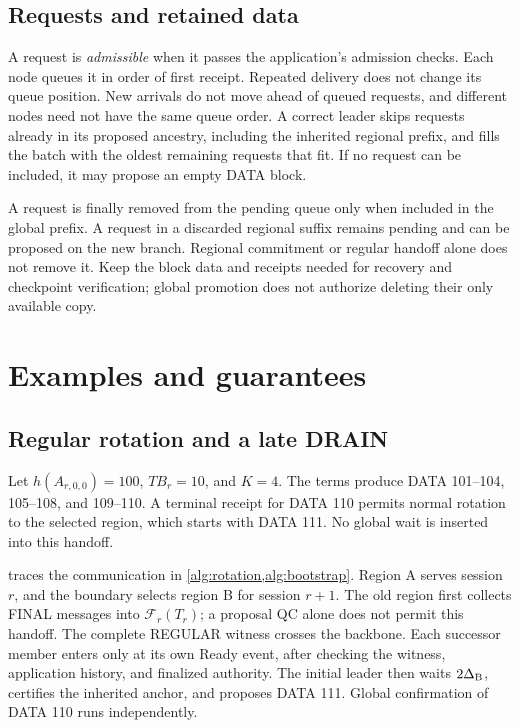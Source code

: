 \documentclass[11pt,a4paper]{article}
\newcommand{\FC}{\mathcal F}
\newcommand{\TB}{\mathit{TB}}
\newcommand{\defterm}[1]{\textcolor{rrBlue}{\textit{#1}}}
\begin{document}
\subsection{Requests and retained data}
\label{sec:requests}
A request is \defterm{admissible} when it passes the application's admission
checks. Each node queues it in order of first receipt. Repeated delivery
does not change its queue position. New arrivals do not move
ahead of queued requests, and different nodes need not have the same
queue order. A correct leader skips requests
already in its proposed ancestry, including the inherited regional
prefix, and fills the batch with the oldest remaining requests that fit.
If no request can be included, it may propose an empty DATA block.

A request is finally removed from the pending queue only when included
in the global prefix. A request in a discarded regional suffix remains
pending and can be proposed on the new branch. Regional commitment or
regular handoff alone does not remove it. Keep the block data and
receipts needed for recovery and checkpoint verification; global
promotion does not authorize deleting their only available copy.

\section{Examples and guarantees}
\label{sec:examples}

\subsection{Regular rotation and a late DRAIN}
Let $h(A_{r,0,0})=100$, $\TB_r=10$, and $K=4$. The terms produce
DATA 101--104, 105--108, and 109--110. A terminal receipt for DATA 110
permits normal rotation to the selected region, which starts with DATA
111. No global wait is inserted into this handoff.

 traces the communication in
\cref{alg:rotation,alg:bootstrap}. Region A serves session $r$, and the
boundary selects region B for session $r+1$. The old region first
collects FINAL messages into $\FC_r(T_r)$; a proposal QC alone does not
permit this handoff. The complete REGULAR witness crosses the backbone.
Each successor member enters only at its own Ready event, after checking
the witness, application history, and finalized authority. The initial
leader then waits $2\Delta_{\rm B}$, certifies the inherited anchor, and
proposes DATA 111. Global confirmation of DATA 110 runs independently.
\end{document}
